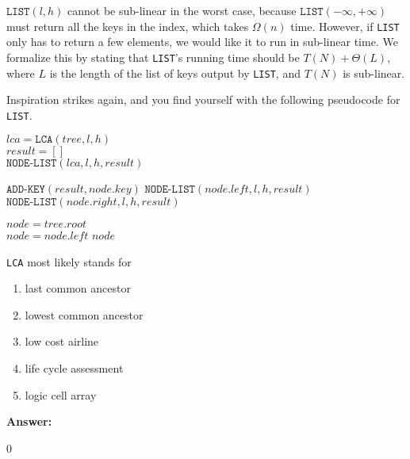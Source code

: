 \documentclass[12pt,twoside]{article}
\newcommand{\answer}{
 \par\medskip
 \textbf{Answer:}
}
\newcommand{\answerIq}{ \answer
0
}
\begin{document}
\begin{problems}
$\texttt{LIST}(l, h)$ cannot be sub-linear in the worst case, because 
$\texttt{LIST}(-\infty, +\infty)$ must return all the keys in the index, which takes
$\Omega(n)$ time. However, if \texttt{LIST} only has to return a few elements, we
would like it to run in sub-linear time. We formalize this by stating that
\texttt{LIST}'s running time should be $T(N) + \Theta(L)$, where $L$ is the length
of the list of keys output by \texttt{LIST}, and $T(N)$ is sub-linear.

Inspiration strikes again, and you find yourself with the following pseudocode
for \texttt{LIST}.

\begin{algorithm}[H]
\caption{$\texttt{LIST}(tree, l, h)$}
  $lca = \texttt{LCA}(tree, l, h)$ \\
  $result = []$ \\
  $\texttt{NODE-LIST}(lca, l, h, result)$ \\
\end{algorithm}

\begin{algorithm}[H]
\caption{$\texttt{NODE-LIST}(node, l, h, result)$}
  {
    \Return
  }
  {
    $\texttt{ADD-KEY}(result, node.key)$
  }
  {
    $\texttt{NODE-LIST}(node.left, l, h, result)$
  }
  {
    $\texttt{NODE-LIST}(node.right, l, h, result)$
  }
\end{algorithm}

\begin{algorithm}[H]
\caption{$\texttt{LCA}(tree, l, h)$}
  $node = tree.root$ \\
  {
    {
      $node = node.left$
    }
  }
  \Return $node$
\end{algorithm}

\begin{problemparts}

  \problempart {} \texttt{LCA} most likely stands for
    \begin{enumerate}
      \item last common ancestor
      \item lowest common ancestor
      \item low cost airline
      \item life cycle assessment
      \item logic cell array
    \end{enumerate}
\answerIq


\end{problemparts}
\end{problems}
\end{document}
